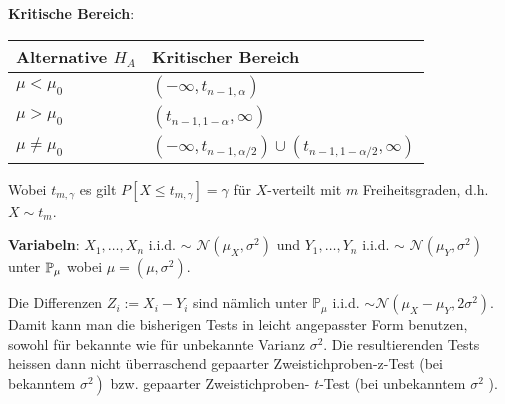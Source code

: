 \textbf{Kritische Bereich}: \renewcommand\arraystretch{1.8}
\begin{center}
    \begin{tabular}{l|l}
  		Alternative $H_A$ & Kritischer Bereich \\
  		\hline
  		$\mu < \mu_0 $ & $(-\infty, t_{n-1, \alpha})$ \\
  		\hline
  		$\mu > \mu_0$ & $(t_{n-1, 1-\alpha}, \infty)$ \\
  		\hline
  		$\mu \neq \mu_0$ & $(-\infty, t_{n-1, \alpha/2}) \cup (t_{n-1, 1-\alpha/2}, \infty)$ 
	\end{tabular}
\end{center}
\renewcommand{\arraystretch}{1}
Wobei $t_{m, \gamma}$ es gilt $P\left[X \leq t_{m, \gamma}\right]=\gamma$ für $X$-verteilt mit $m$ Freiheitsgraden, d.h. $X \sim t_{m}$.


\textbf{Variabeln}: $X_1, \ldots , X_n$ i.i.d. $\sim$ $\mathcal{N}(\mu_X, \sigma^2)$ und $Y_1, \ldots , Y_n$ i.i.d. $\sim$ $\mathcal{N}(\mu_Y, \sigma^2)$ unter $\mathbb{P}_\mu$ wobei $\mu = (\mu, \sigma^2)$.

Die Differenzen $Z_{i}:=X_{i}-Y_{i}$ sind nämlich unter $\mathbb{P}_{\mu}$ i.i.d. $\sim \mathcal{N}\left(\mu_{X}-\mu_{Y}, 2 \sigma^{2}\right)$. Damit kann man die bisherigen Tests in leicht angepasster Form benutzen, sowohl für bekannte wie für unbekannte Varianz $\sigma^{2}$. Die resultierenden Tests heissen dann nicht überraschend gepaarter Zweistichproben-z-Test (bei bekanntem $\left.\sigma^{2}\right)$ bzw. gepaarter Zweistichproben- $t$-Test (bei unbekanntem $\sigma^{2}$ ).


